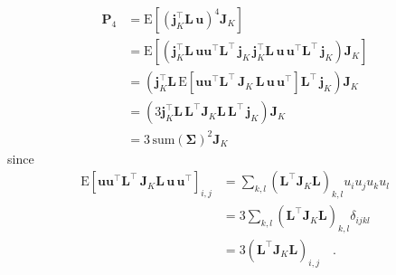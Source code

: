 \documentclass[modern]{aastex62}
\begin{document}
\begin{align}
    \mathbf{P}_4 & = \mathrm{E}\left[ \left(\mathbf{j}_K^\top \mathbf{L} \, \mathbf{u}\right)^4 \mathbf{J}_K \right]
    \nonumber                                                                                                                                                                                                                                                           \\
                 & = \mathrm{E}\left[\left(\mathbf{j}_K^\top \mathbf{L} \,  \mathbf{u} \mathbf{u}^\top  \mathbf{L}^\top \, \mathbf{j}_K \, \mathbf{j}_K^\top \mathbf{L} \,  \mathbf{u} \, \mathbf{u}^\top  \mathbf{L}^\top \, \mathbf{j}_K \right) \mathbf{J}_K \right]
    \nonumber                                                                                                                                                                                                                                                           \\
                 & = \left(\mathbf{j}_K^\top \mathbf{L} \, \mathrm{E}\left[ \mathbf{u} \mathbf{u}^\top  \mathbf{L}^\top \, \mathbf{J}_K \, \mathbf{L} \,  \mathbf{u} \, \mathbf{u}^\top \right] \mathbf{L}^\top \, \mathbf{j}_K \right) \mathbf{J}_K
    \nonumber                                                                                                                                                                                                                                                           \\
                 & = \left(3 \mathbf{j}_K^\top \mathbf{L} \, \mathbf{L}^\top \mathbf{J}_K \mathbf{L} \, \mathbf{L}^\top \, \mathbf{j}_K \right) \mathbf{J}_K
    \nonumber                                                                                                                                                                                                                                                           \\
                 & = 3 \, \mathrm{sum}(\mathbf{\Sigma})^2  \mathbf{J}_K
\end{align}
%
since
\begin{align}
    \mathrm{E}\left[\mathbf{u} \mathbf{u}^\top  \mathbf{L}^\top \, \mathbf{J}_K \mathbf{L} \,  \mathbf{u} \,  \mathbf{u}^\top\right]_{i,j}
     & =
    \sum\limits_{k,l}(\mathbf{L}^\top \mathbf{J}_K \mathbf{L})_{k,l} u_i u_j u_k u_l
    \nonumber \\
     & =
    3 \sum\limits_{k,l}(\mathbf{L}^\top \mathbf{J}_K \mathbf{L})_{k,l} \delta_{ijkl}
    \nonumber \\
     & =
    3 (\mathbf{L}^\top \mathbf{J}_K \mathbf{L})_{i,j}
    \nonumber \quad.
\end{align}
\end{document}
